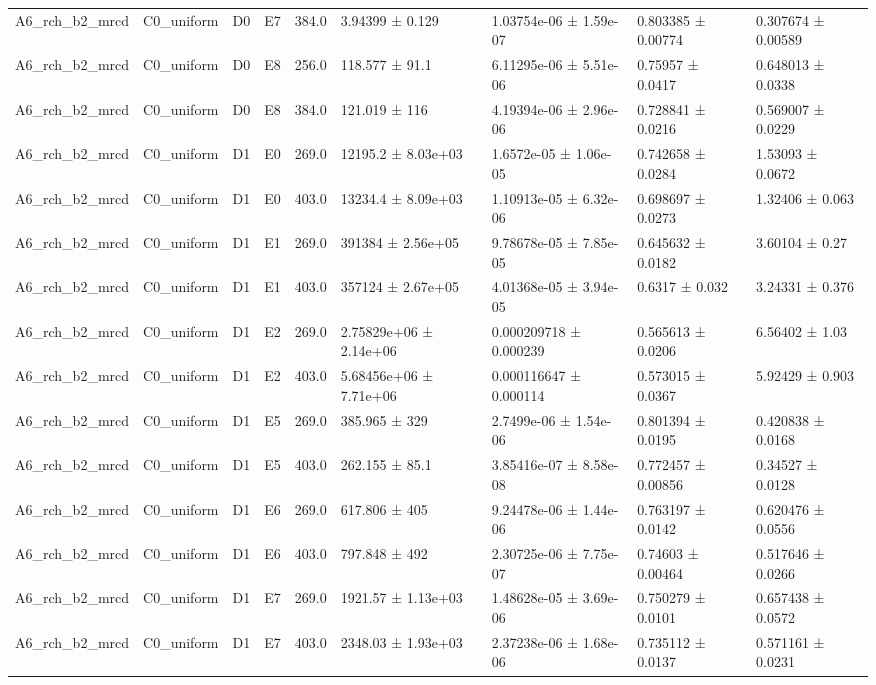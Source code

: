 \begin{table}
\begin{tabular}{lllllllll}
A6\_rch\_b2\_mrcd & C0\_uniform & D0 & E7 & 384.0 & 3.94399 ± 0.129 & 1.03754e-06 ± 1.59e-07 & 0.803385 ± 0.00774 & 0.307674 ± 0.00589 \\
A6\_rch\_b2\_mrcd & C0\_uniform & D0 & E8 & 256.0 & 118.577 ± 91.1 & 6.11295e-06 ± 5.51e-06 & 0.75957 ± 0.0417 & 0.648013 ± 0.0338 \\
A6\_rch\_b2\_mrcd & C0\_uniform & D0 & E8 & 384.0 & 121.019 ± 116 & 4.19394e-06 ± 2.96e-06 & 0.728841 ± 0.0216 & 0.569007 ± 0.0229 \\
A6\_rch\_b2\_mrcd & C0\_uniform & D1 & E0 & 269.0 & 12195.2 ± 8.03e+03 & 1.6572e-05 ± 1.06e-05 & 0.742658 ± 0.0284 & 1.53093 ± 0.0672 \\
A6\_rch\_b2\_mrcd & C0\_uniform & D1 & E0 & 403.0 & 13234.4 ± 8.09e+03 & 1.10913e-05 ± 6.32e-06 & 0.698697 ± 0.0273 & 1.32406 ± 0.063 \\
A6\_rch\_b2\_mrcd & C0\_uniform & D1 & E1 & 269.0 & 391384 ± 2.56e+05 & 9.78678e-05 ± 7.85e-05 & 0.645632 ± 0.0182 & 3.60104 ± 0.27 \\
A6\_rch\_b2\_mrcd & C0\_uniform & D1 & E1 & 403.0 & 357124 ± 2.67e+05 & 4.01368e-05 ± 3.94e-05 & 0.6317 ± 0.032 & 3.24331 ± 0.376 \\
A6\_rch\_b2\_mrcd & C0\_uniform & D1 & E2 & 269.0 & 2.75829e+06 ± 2.14e+06 & 0.000209718 ± 0.000239 & 0.565613 ± 0.0206 & 6.56402 ± 1.03 \\
A6\_rch\_b2\_mrcd & C0\_uniform & D1 & E2 & 403.0 & 5.68456e+06 ± 7.71e+06 & 0.000116647 ± 0.000114 & 0.573015 ± 0.0367 & 5.92429 ± 0.903 \\
A6\_rch\_b2\_mrcd & C0\_uniform & D1 & E5 & 269.0 & 385.965 ± 329 & 2.7499e-06 ± 1.54e-06 & 0.801394 ± 0.0195 & 0.420838 ± 0.0168 \\
A6\_rch\_b2\_mrcd & C0\_uniform & D1 & E5 & 403.0 & 262.155 ± 85.1 & 3.85416e-07 ± 8.58e-08 & 0.772457 ± 0.00856 & 0.34527 ± 0.0128 \\
A6\_rch\_b2\_mrcd & C0\_uniform & D1 & E6 & 269.0 & 617.806 ± 405 & 9.24478e-06 ± 1.44e-06 & 0.763197 ± 0.0142 & 0.620476 ± 0.0556 \\
A6\_rch\_b2\_mrcd & C0\_uniform & D1 & E6 & 403.0 & 797.848 ± 492 & 2.30725e-06 ± 7.75e-07 & 0.74603 ± 0.00464 & 0.517646 ± 0.0266 \\
A6\_rch\_b2\_mrcd & C0\_uniform & D1 & E7 & 269.0 & 1921.57 ± 1.13e+03 & 1.48628e-05 ± 3.69e-06 & 0.750279 ± 0.0101 & 0.657438 ± 0.0572 \\
A6\_rch\_b2\_mrcd & C0\_uniform & D1 & E7 & 403.0 & 2348.03 ± 1.93e+03 & 2.37238e-06 ± 1.68e-06 & 0.735112 ± 0.0137 & 0.571161 ± 0.0231 \\

\end{tabular}
\end{table}
